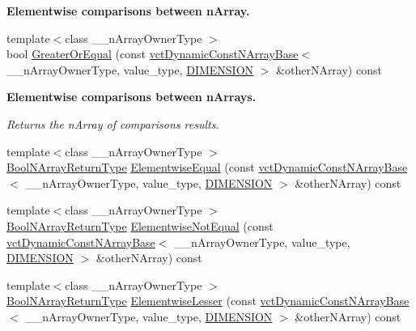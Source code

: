 \begin{Indent}{\bf Elementwise comparisons between n\+Array.}
\begin{DoxyCompactItemize}
\item 
{\footnotesize template$<$class \+\_\+\+\_\+n\+Array\+Owner\+Type $>$ }\\bool \hyperlink{classvct_dynamic_const_n_array_base_ab7a14c756ce67c46751370b35bf553a7}{Greater\+Or\+Equal} (const \hyperlink{classvct_dynamic_const_n_array_base}{vct\+Dynamic\+Const\+N\+Array\+Base}$<$ \+\_\+\+\_\+n\+Array\+Owner\+Type, value\+\_\+type, \hyperlink{classvct_dynamic_const_n_array_base_a815ac316ebc1bb2ab1969d307549826faf759c9ab831ff929b89af4ea2865a378}{D\+I\+M\+E\+N\+S\+I\+O\+N} $>$ \&other\+N\+Array) const 
\end{DoxyCompactItemize}
\end{Indent}
\begin{Indent}{\bf Elementwise comparisons between n\+Arrays.}\par
{\em Returns the n\+Array of comparison\textquotesingle{}s results. }\begin{DoxyCompactItemize}
\item 
{\footnotesize template$<$class \+\_\+\+\_\+n\+Array\+Owner\+Type $>$ }\\\hyperlink{classvct_dynamic_const_n_array_base_a983f2b7edd51a896d447383b5a5af289}{Bool\+N\+Array\+Return\+Type} \hyperlink{classvct_dynamic_const_n_array_base_aaf132638161f6ca6d065e07e56a8e282}{Elementwise\+Equal} (const \hyperlink{classvct_dynamic_const_n_array_base}{vct\+Dynamic\+Const\+N\+Array\+Base}$<$ \+\_\+\+\_\+n\+Array\+Owner\+Type, value\+\_\+type, \hyperlink{classvct_dynamic_const_n_array_base_a815ac316ebc1bb2ab1969d307549826faf759c9ab831ff929b89af4ea2865a378}{D\+I\+M\+E\+N\+S\+I\+O\+N} $>$ \&other\+N\+Array) const 
\item 
{\footnotesize template$<$class \+\_\+\+\_\+n\+Array\+Owner\+Type $>$ }\\\hyperlink{classvct_dynamic_const_n_array_base_a983f2b7edd51a896d447383b5a5af289}{Bool\+N\+Array\+Return\+Type} \hyperlink{classvct_dynamic_const_n_array_base_ab27e10a24a8c6a5b8480e660416aa93e}{Elementwise\+Not\+Equal} (const \hyperlink{classvct_dynamic_const_n_array_base}{vct\+Dynamic\+Const\+N\+Array\+Base}$<$ \+\_\+\+\_\+n\+Array\+Owner\+Type, value\+\_\+type, \hyperlink{classvct_dynamic_const_n_array_base_a815ac316ebc1bb2ab1969d307549826faf759c9ab831ff929b89af4ea2865a378}{D\+I\+M\+E\+N\+S\+I\+O\+N} $>$ \&other\+N\+Array) const 
\item 
{\footnotesize template$<$class \+\_\+\+\_\+n\+Array\+Owner\+Type $>$ }\\\hyperlink{classvct_dynamic_const_n_array_base_a983f2b7edd51a896d447383b5a5af289}{Bool\+N\+Array\+Return\+Type} \hyperlink{classvct_dynamic_const_n_array_base_a4e97a98d89c11e2a5a91bdfaf1de2ac6}{Elementwise\+Lesser} (const \hyperlink{classvct_dynamic_const_n_array_base}{vct\+Dynamic\+Const\+N\+Array\+Base}$<$ \+\_\+\+\_\+n\+Array\+Owner\+Type, value\+\_\+type, \hyperlink{classvct_dynamic_const_n_array_base_a815ac316ebc1bb2ab1969d307549826faf759c9ab831ff929b89af4ea2865a378}{D\+I\+M\+E\+N\+S\+I\+O\+N} $>$ \&other\+N\+Array) const 

\end{DoxyCompactItemize}
\end{Indent}

